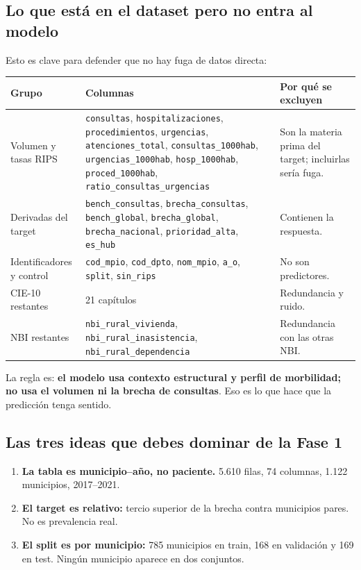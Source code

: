 \documentclass[11pt,a4paper]{article}
\newcommand{\code}[1]{\texttt{#1}}
\begin{document}
\subsection{Lo que está en el dataset pero \textbf{no} entra al modelo}

Esto es clave para defender que no hay fuga de datos directa:

\begin{table}[H]
\centering
\footnotesize
\begin{tabularx}{\textwidth}{@{}L{4.2cm} Y L{4.3cm}@{}}
\toprule
\textbf{Grupo} & \textbf{Columnas} & \textbf{Por qué se excluyen} \\
\midrule
Volumen y tasas RIPS &
\code{consultas}, \code{hospitalizaciones}, \code{procedimientos}, \code{urgencias},
\code{atenciones_total}, \code{consultas_1000hab}, \code{urgencias_1000hab},
\code{hosp_1000hab}, \code{proced_1000hab}, \code{ratio_consultas_urgencias} &
Son la materia prima del target; incluirlas sería fuga. \\
Derivadas del target &
\code{bench_consultas}, \code{brecha_consultas}, \code{bench_global}, \code{brecha_global},
\code{brecha_nacional}, \code{prioridad_alta}, \code{es_hub} &
Contienen la respuesta. \\
Identificadores y control &
\code{cod_mpio}, \code{cod_dpto}, \code{nom_mpio}, \code{a_o}, \code{split}, \code{sin_rips} &
No son predictores. \\
CIE-10 restantes & 21 capítulos & Redundancia y ruido. \\
NBI restantes &
\code{nbi_rural_vivienda}, \code{nbi_rural_inasistencia}, \code{nbi_rural_dependencia} &
Redundancia con las otras NBI. \\
\bottomrule
\end{tabularx}
\end{table}

La regla es: \textbf{el modelo usa contexto estructural y perfil de morbilidad; no usa el volumen ni la brecha de consultas}. Eso es lo que hace que la predicción tenga sentido.

\subsection{Las tres ideas que debes dominar de la Fase 1}

\begin{tcolorbox}[idea,title={Ideas clave}]
\begin{enumerate}[leftmargin=*,itemsep=2pt]
  \item \textbf{La tabla es municipio--año, no paciente.} 5.610 filas, 74 columnas, 1.122 municipios, 2017--2021.
  \item \textbf{El target es relativo:} tercio superior de la brecha contra municipios pares. No es prevalencia real.
  \item \textbf{El split es por municipio:} 785 municipios en train, 168 en validación y 169 en test. Ningún municipio aparece en dos conjuntos.
\end{enumerate}
\end{tcolorbox}
\end{document}

